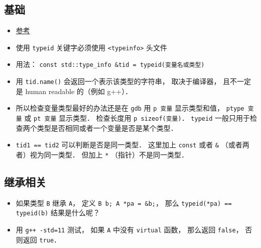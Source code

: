 
\begin{issues}
\issueDraft
\end{issues}

\subsection{基础}
\begin{itemize}
\item \href{https://en.cppreference.com/w/cpp/language/typeid}{参考}
\item 使用 \verb|typeid| 关键字必须使用 \verb|<typeinfo>| 头文件
\item 用法： \verb|const std::type_info &tid = typeid(变量名或类型)|
\item 用 \verb|tid.name()| 会返回一个表示该类型的字符串， 取决于编译器， 且不一定是 human readable 的（例如 g++）．
\item 所以检查变量类型最好的办法还是在 \verb|gdb| 用 \verb|p 变量| 显示类型和值， \verb|ptype 变量| 或 \verb|pt 变量| 显示类型． 检查长度用 \verb|p sizeof(变量)|． \verb|typeid| 一般只用于检查两个类型是否相同或者一个变量是否是某个类型．
\item \verb|tid1 == tid2| 可以判断是否是同一类型． 这里加上 \verb|const| 或者 \verb|&| （或者两者）视为同一类型． 但加上 \verb|*| （指针）不是同一类型．
\end{itemize}

\subsection{继承相关}
\begin{itemize}
\item 如果类型 \verb|B| 继承 \verb|A|， 定义 \verb|B b; A *pa = &b;|， 那么 \verb|typeid(*pa) == typeid(b)| 结果是什么呢？
\item 用 \verb|g++ -std=11| 测试， 如果 \verb|A| 中没有 \verb|virtual| 函数， 那么返回 \verb|false|， 否则返回 \verb|true|．
\end{itemize}

